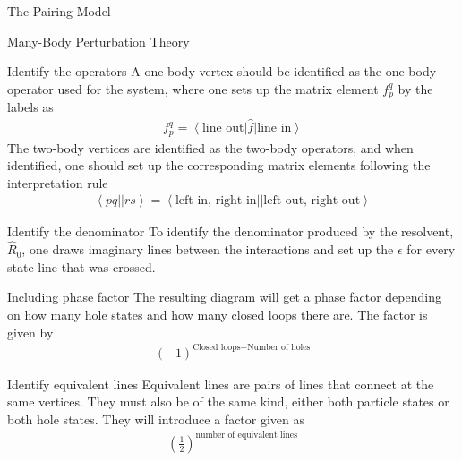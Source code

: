 \documentclass[twoside,english]{uiofysmaster}
\begin{document}
\begin{chapter}{The Pairing Model}
\begin{section}{Many-Body Perturbation Theory}
		\begin{subsection}{Identify the operators}
			A one-body vertex should be identified as the one-body operator used for the system, where one sets up the matrix element $f_p^q$ by the labels as
			\begin{align}
				f_p^q = \left< \text{line out} \right| \hat f \left| \text{line in} \right>
			\end{align}
			The two-body vertices are identified as the two-body operators, and when identified, one should set up the corresponding matrix elements following the interpretation rule
			\begin{align}
				\left< pq || rs \right> = \left< \text{left in, right in} || \text{left out, right out} \right> 
			\end{align}
		\end{subsection}

		\begin{subsection}{Identify the denominator}
			To identify the denominator produced by the resolvent, $\hat R_0$, one draws imaginary lines between the interactions and set up the $\epsilon$ for every state-line that was crossed.
		\end{subsection}

		\begin{subsection}{Including phase factor}
			The resulting diagram will get a phase factor depending on how many hole states and how many closed loops there are. The factor is given by 
			\begin{align}
				(-1)^{\text{Closed loops} + \text{Number of holes}}
			\end{align}
		\end{subsection}

		\begin{subsection}{Identify equivalent lines}
			Equivalent lines are pairs of lines that connect at the same vertices. They must also be of the same kind, either both particle states or both hole states. They will introduce a factor given as 
			\begin{align}
				\left( \frac{1}{2} \right)^{\text{number of equivalent lines}}
			\end{align}
		\end{subsection}


\end{section}
\end{chapter}
\end{document}
